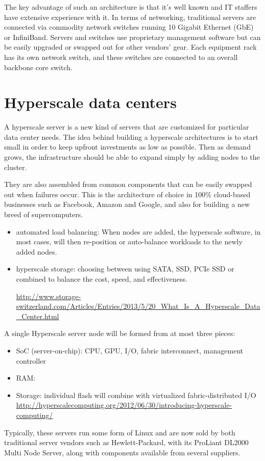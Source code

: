 The key advantage of such an architecture is that it's well known and IT
staffers have extensive experience with it. In terms of networking, traditional
servers are connected via commodity network switches running 10 Gigabit Ethernet
(GbE) or InfiniBand. Servers and switches use proprietary management software
but can be easily upgraded or swapped out for other vendors' gear. Each
equipment rack has its own network switch, and these switches are connected to
an overall backbone core switch.  


\section{Hyperscale data centers}


A hyperscale server is a new kind of servers that are customized for particular
data center needs.
The idea behind building a hyperscale architectures is to start small in order
to keep upfront investments as low as possible. Then as demand grows, the
infrastructure should be able to expand simply by adding nodes to the cluster.  

They are also assembled from common components that can be
easily swapped out when failures occur. This is the architecture of choice in
100\% cloud-based businesses such as Facebook, Amazon and Google, and also for
building a new breed of supercomputers.

\begin{itemize}
  \item automated load balancing: When nodes are added, the hyperscale software, in most cases, will then
re-position or auto-balance workloads to the newly added nodes. 
  
  \item hyperscale storage: choosing between using SATA, SSD, PCIe SSD or
  combined to balance the cost, speed, and effectiveness.
  
  \url{http://www.storage-switzerland.com/Articles/Entries/2013/5/20_What_Is_A_Hyperscale_Data_Center.html}
\end{itemize}

A single Hyperscale server node will be formed from at most three pieces:
\begin{itemize}
  \item SoC (server-on-chip): CPU, GPU, I/O, fabric interconnect, management
  controller
   
  \item RAM: 
  
  \item Storage:  individual flash will combine with virtualized
  fabric-distributed I/O
  \url{http://hyperscalecomputing.org/2012/06/30/introducing-hyperscale-computing/}
\end{itemize}
Typically, these servers run some form of Linux and are now sold by both
traditional server vendors such as Hewlett-Packard, with its ProLiant DL2000
Multi Node Server, along with components available from several suppliers. 

